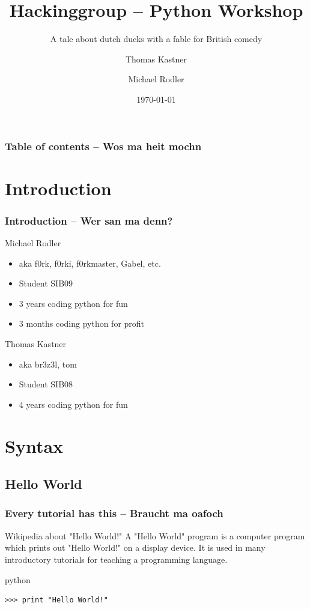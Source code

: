 \documentclass{beamer}
\title[Python Workshop]{Hackinggroup -- Python Workshop}
\subtitle{A tale about dutch ducks with a fable for British comedy}
\author[Thomas Kastner, Michael Rodler]{Thomas Kastner\and Michael Rodler}
\date{\today}
\begin{document}
\begin{frame}
    \titlepage
\end{frame}

\begin{frame}
    \frametitle{Table of contents -- Wos ma heit mochn}
    \tableofcontents
\end{frame}

\section{Introduction}

\begin{frame}
    \frametitle{Introduction -- Wer san ma denn?}

    \begin{block}{Michael Rodler}
    \begin{itemize}
        \item aka f0rk, f0rki, f0rkmaster, Gabel, etc.
        \item Student SIB09
        \item 3 years coding python for fun
        \item 3 months coding python for profit
    \end{itemize}
    \end{block}

    \begin{block}{Thomas Kastner}
    \begin{itemize}
        \item aka br3z3l, tom
        \item Student SIB08
        \item 4 years coding python for fun
    \end{itemize}
    \end{block}
\end{frame}


\section{Syntax}
\subsection{Hello World}
\begin{frame}[fragile]
    \frametitle{Every tutorial has this -- Braucht ma oafoch}
    \begin{block}{Wikipedia about "Hello World!"}
    A "Hello World" program is a computer program which prints out "Hello World!" on a display device. It is used in many introductory tutorials for teaching a programming language.
    \end{block}

    \begin{exampleblock}{python}
    \begin{lstlisting}
>>> print "Hello World!" 
    \end{lstlisting}
    \end{exampleblock}
\end{frame}
\end{document}
